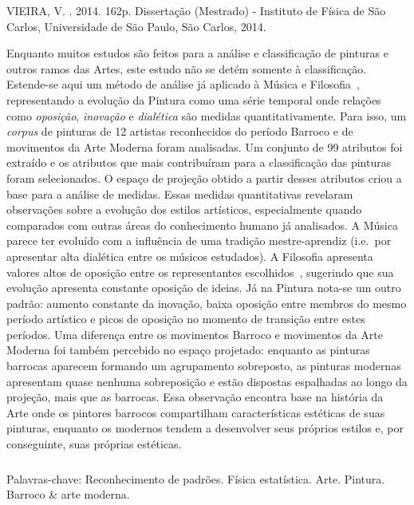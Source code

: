\begin{resumo2}
\vspace{-10mm}
VIEIRA, V. \textbf{\ABNTtitulodata}. 2014. 162p. Dissertação (Mestrado) - Instituto de Física de São Carlos, Universidade de São Paulo, São Carlos, 2014.
\vspace{15mm}

Enquanto muitos estudos são feitos para a análise e classificação de
pinturas e outros ramos das Artes, este estudo não se detém somente à
classificação. Estende-se aqui um método de análise já aplicado à
Música e Filosofia~\cite{vieira}, representando a evolução da Pintura
como uma série temporal onde relações como \textit{oposição},
\textit{inovação} e \textit{dialética} são medidas
quantitativamente. Para isso, um \textit{corpus} de pinturas de 12
artistas reconhecidos do período Barroco e de movimentos da Arte
Moderna foram analisadas. Um conjunto de 99 atributos foi extraído e
os atributos que mais contribuíram para a classificação das pinturas
foram selecionados. O espaço de projeção obtido a partir desses
atributos criou a base para a análise de medidas. Essas medidas
quantitativas revelaram observações sobre a evolução dos estilos
artísticos, especialmente quando comparados com outras áreas do
conhecimento humano já analisados. A Música parece ter evoluído com a
influência de uma tradição mestre-aprendiz (i.e.\ por apresentar alta
dialética entre os músicos estudados). A Filosofia apresenta valores
altos de oposição entre os representantes escolhidos~\cite{vieira},
sugerindo que sua evolução apresenta constante oposição de ideias. Já
na Pintura nota-se um outro padrão: aumento constante da inovação,
baixa oposição entre membros do mesmo período artístico e picos de
oposição no momento de transição entre estes períodos. Uma diferença
entre os movimentos Barroco e movimentos da Arte Moderna foi também
percebido no espaço projetado: enquanto as pinturas barrocas aparecem
formando um agrupamento sobreposto, as pinturas modernas apresentam
quase nenhuma sobreposição e estão dispostas espalhadas ao longo da
projeção, mais que as barrocas. Essa observação encontra base na
história da Arte onde os pintores barrocos compartilham
características estéticas de suas pinturas, enquanto os modernos
tendem a desenvolver seus próprios estilos e, por conseguinte, suas
próprias estéticas.

$\phantom{linha em branco}$\\ Palavras-chave: Reconhecimento de
padrões. Física estatística. Arte. Pintura. Barroco \& arte
moderna. 

\end{resumo2}


